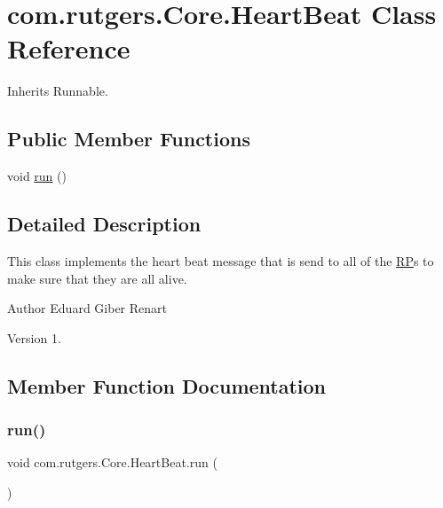 \hypertarget{classcom_1_1rutgers_1_1Core_1_1HeartBeat}{}\section{com.\+rutgers.\+Core.\+Heart\+Beat Class Reference}
\label{classcom_1_1rutgers_1_1Core_1_1HeartBeat}


Inherits Runnable.

\subsection*{Public Member Functions}
\begin{DoxyCompactItemize}
\item 
void \hyperlink{classcom_1_1rutgers_1_1Core_1_1HeartBeat_a0d9ca37ab5618b50adbfd7815549579d}{run} ()
\end{DoxyCompactItemize}


\subsection{Detailed Description}
This class implements the heart beat message that is send to all of the \hyperlink{classcom_1_1rutgers_1_1Core_1_1RP}{RP}\textquotesingle{}s to make sure that they are all alive.

\begin{DoxyAuthor}{Author}
Eduard Giber Renart 
\end{DoxyAuthor}
\begin{DoxyVersion}{Version}
1. 
\end{DoxyVersion}


\subsection{Member Function Documentation}
\mbox{\label{classcom_1_1rutgers_1_1Core_1_1HeartBeat_a0d9ca37ab5618b50adbfd7815549579d}} 
\subsubsection{\texorpdfstring{run()}{run()}}
{\footnotesize\ttfamily void com.\+rutgers.\+Core.\+Heart\+Beat.\+run (\begin{DoxyParamCaption}{ }\end{DoxyParamCaption})}

